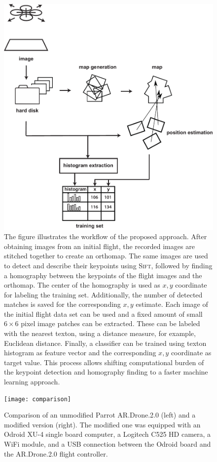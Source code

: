 \documentclass{report}
\begin{document}
\begin{figure}[h!]
\begin{center}
\includegraphics[width=0.7\columnwidth]{overview_sift}
\caption{{\label{fig:overview} The figure illustrates the workflow of
    the proposed approach. After obtaining images from an initial
    flight, the recorded images are stitched together to create an
    orthomap. The same images are used to detect and describe their
    keypoints using \textsc{Sift}, followed by finding a homography
    between the keypoints of the flight images and the orthomap. The
    center of the homography is used as $x, y$ coordinate for labeling
    the training set. Additionally, the number of detected matches is
    saved for the corresponding $x, y$ estimate. Each image of the
    initial flight data set can be used and a fixed amount of small
    $6\times6$ pixel image patches can be extracted. These can be
    labeled with the nearest texton, using a distance measure, for
    example, Euclidean distance. Finally, a classifier can be trained
    using texton histogram as feature vector and the corresponding
    $x, y$ coordinate as target value. This process allows shifting
    computational burden of the keypoint detection and homography
    finding to a faster machine learning approach.%
  }}
\end{center}
\end{figure}

\begin{figure}[h!]
\begin{center}
\texttt{[image: comparison]}
\caption{{\label{fig:comparison}
Comparison of an unmodified Parrot AR.Drone.2.0 (left) and a
    modified version (right). The modified one was equipped with an
    Odroid XU-4 single board computer, a Logitech C525 HD camera, a
    WiFi module, and a USB connection between the Odroid board and the
    AR.Drone.2.0 flight controller.%
}}
\end{center}
\end{figure}
\end{document}
